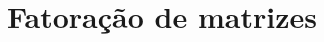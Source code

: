 \documentclass[
    12pt,                %
    oneside,            %
    a4paper,            %
    english,            %
    brazil                %
    ]{abntex2ppgsi}
\begin{document}



\chapter{Fatoração de matrizes}
\label{ch:fatoracao}
\end{document}
